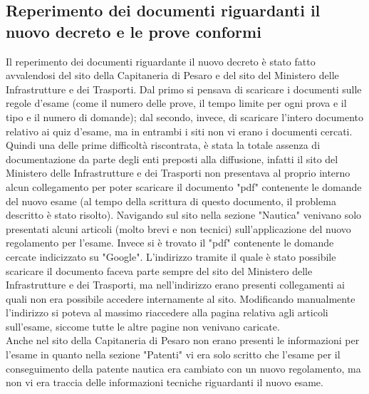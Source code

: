 \subsection{Reperimento dei documenti riguardanti il nuovo decreto e le prove conformi}
Il reperimento dei documenti riguardante il nuovo decreto è stato fatto avvalendosi del sito della Capitaneria di Pesaro e del sito del Ministero delle Infrastrutture e dei Trasporti. Dal primo si pensava di scaricare i documenti sulle regole d'esame (come il numero delle prove, il tempo limite per ogni prova e il tipo e il numero di domande); dal secondo, invece,  di scaricare l'intero documento relativo ai quiz d'esame, ma in entrambi i siti non vi erano i documenti cercati. %
Quindi una delle prime difficoltà riscontrata, è stata la totale assenza di documentazione da parte degli enti preposti alla diffusione, infatti  il sito del Ministero delle Infrastrutture e dei Trasporti non presentava al proprio interno alcun collegamento per poter scaricare il documento "pdf" contenente le domande del nuovo esame (al tempo della scrittura di questo documento, il problema descritto è stato risolto). Navigando sul sito nella sezione "Nautica" venivano solo presentati alcuni articoli (molto brevi e non tecnici)  sull'applicazione del nuovo regolamento per l'esame. Invece si è trovato il "pdf" contenente le domande cercate indicizzato su "Google". L'indirizzo  tramite il quale è stato possibile scaricare il documento faceva parte sempre del sito del Ministero delle Infrastrutture e dei Trasporti, ma nell'indirizzo erano presenti collegamenti ai quali non era possibile accedere internamente al sito. Modificando manualmente l'indirizzo  si poteva al massimo riaccedere alla pagina relativa agli articoli sull'esame, siccome tutte le altre pagine non venivano caricate.\\
Anche nel sito della Capitaneria di Pesaro non erano presenti le informazioni per l'esame in quanto nella sezione "Patenti" vi era solo scritto che l'esame per il conseguimento della patente nautica era cambiato con un nuovo regolamento, ma non vi era traccia delle informazioni tecniche riguardanti il nuovo esame.\\
